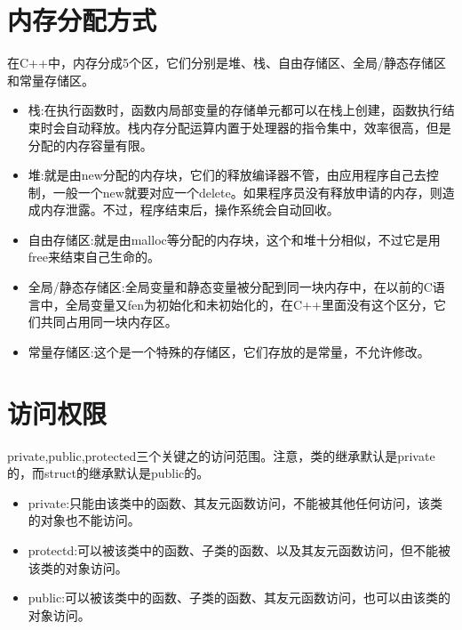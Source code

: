\section{内存分配方式}
在C++中，内存分成5个区，它们分别是堆、栈、自由存储区、全局/静态存储区和常量存储区。
	\begin{itemize}
		\item 栈:在执行函数时，函数内局部变量的存储单元都可以在栈上创建，函数执行结束时会自动释放。栈内存分配运算内置于处理器的指令集中，效率很高，但是分配的内存容量有限。
		\item 堆:就是由new分配的内存块，它们的释放编译器不管，由应用程序自己去控制，一般一个new就要对应一个delete。如果程序员没有释放申请的内存，则造成内存泄露。不过，程序结束后，操作系统会自动回收。
		\item 自由存储区:就是由malloc等分配的内存块，这个和堆十分相似，不过它是用free来结束自己生命的。
		\item 全局/静态存储区:全局变量和静态变量被分配到同一块内存中，在以前的C语言中，全局变量又fen为初始化和未初始化的，在C++里面没有这个区分，它们共同占用同一块内存区。
		\item 常量存储区:这个是一个特殊的存储区，它们存放的是常量，不允许修改。
	\end{itemize}


\section{访问权限}
private,public,protected三个关键之的访问范围。注意，类的继承默认是private的，而struct的继承默认是public的。
	\begin{itemize}
		\item private:只能由该类中的函数、其友元函数访问，不能被其他任何访问，该类的对象也不能访问。
		\item protectd:可以被该类中的函数、子类的函数、以及其友元函数访问，但不能被该类的对象访问。 
		\item public:可以被该类中的函数、子类的函数、其友元函数访问，也可以由该类的对象访问。 
	\end{itemize}

